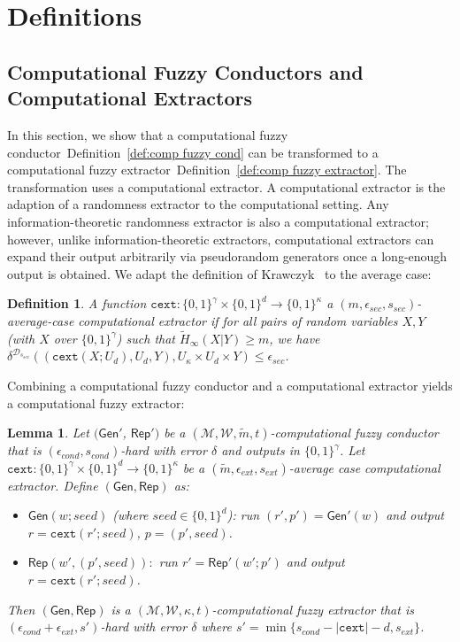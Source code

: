 \documentclass[11pt]{article}
\newcommand{\defref}[1]{\mbox{Definition~\ref{#1}}}
\newcommand{\class}[1]{{\ensuremath{\mathsf{#1}}}}
\newcommand{\gen}{\ensuremath{\class{Gen}}\xspace}
\newcommand{\rep}{\ensuremath{\class{Rep}}\xspace}
\newcommand{\zo}{\ensuremath{\{0, 1\}}}
\newcommand{\cext}{\ensuremath{\mathtt{cext}}}
\newtheorem{lemma}[theorem]{Lemma}
\newtheorem{definition}[theorem]{Definition}
\begin{document}
\appendix

\section{Definitions}
\subsection{Computational Fuzzy Conductors and Computational Extractors}
\label{sec:further defs}
In this section, we show that a computational fuzzy conductor~\defref{def:comp fuzzy cond} can be transformed to a computational fuzzy extractor~\defref{def:comp fuzzy extractor}.  The transformation uses a computational extractor.
A computational extractor is the adaption of a randomness extractor to the computational setting.  Any information-theoretic randomness extractor is also a computational extractor; however, unlike information-theoretic extractors, computational extractors can expand their output arbitrarily via pseudorandom generators once a long-enough output is obtained. We adapt the definition of Krawczyk~\cite{krawczyk2010cryptographic} to the average case:
\begin{definition}
A function $\cext: \zo^\gamma \times \{0,1\}^d \rightarrow \{0,1\}^\kappa$ a \emph{$(m, \epsilon_{sec}, s_{sec})$-average-case computational extractor} if for all pairs
of random variables $X, Y$ (with $X$ over $\zo^\gamma$) such that
$\tilde{H}_\infty(X|Y) \ge m$, we have $\delta^{\mathcal{D}_{s_{sec}}}((\cext(X; U_d), U_d, Y), U_\kappa\times
U_d \times Y) \le \epsilon_{sec}$.
\end{definition}

Combining a computational fuzzy conductor and a computational extractor yields a computational fuzzy extractor:

\begin{lemma}
\label{lem:cond and cext}
Let $(\gen'$, $\rep')$ be a $(\mathcal{M}, \mathcal{W}, \tilde{m}, t)$-computational fuzzy conductor that is $(\epsilon_{cond}, s_{cond})$-hard with error $\delta$ and outputs in $\zo^\gamma$.  Let $\cext:\zo^\gamma\times \zo^d\rightarrow \zo^\kappa$ be a $(\tilde{m}, \epsilon_{ext}, s_{ext})$-average case computational extractor.  Define $(\gen, \rep)$ as:
\begin{itemize}
\item $\gen(w; seed)$ (where $seed\in \zo^d$): run $(r', p')= \gen'(w)$ and output $r = \cext(r'; seed)$, $p = (p', seed)$.
\item $\rep(w', (p', seed)):$ run $r' = \rep'(w'; p')$ and output $r = \cext(r'; seed)$.
\end{itemize}
Then $(\gen, \rep)$ is a $(\mathcal{M}, \mathcal{W}, \kappa, t)$-computational fuzzy extractor that is $(\epsilon_{cond}+\epsilon_{ext}, s')$-hard with error $\delta$ where $s' = \min\{s_{cond} - |\cext| -d, s_{ext}\}$.
\end{lemma}
\end{document}
